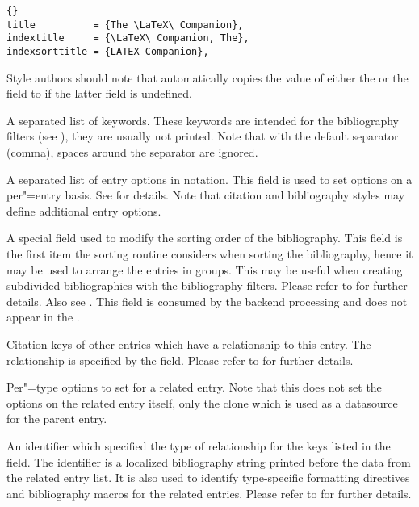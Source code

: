 \documentclass{ltxdockit}[2011/03/25]
\begin{document}
\begin{fieldlist}
\begin{lstlisting}[style=bibtex]{}
title          = {The \LaTeX\ Companion},
indextitle     = {\LaTeX\ Companion, The},
indexsorttitle = {LATEX Companion},
\end{lstlisting}
%
Style authors should note that  automatically copies the value of either the  or the  field to  if the latter field is undefined.


A separated list of keywords. These keywords are intended for the bibliography filters (see ), they are usually not printed. Note that with the default separator (comma), spaces around the separator are ignored.


A separated list of entry options in \keyval notation. This field is used to set options on a per"=entry basis. See  for details. Note that citation and bibliography styles may define additional entry options.


A special field used to modify the sorting order of the bibliography. This field is the first item the sorting routine considers when sorting the bibliography, hence it may be used to arrange the entries in groups. This may be useful when creating subdivided bibliographies with the bibliography filters. Please refer to  for further details. Also see . This field is consumed by the backend processing and does not appear in the .


Citation keys of other entries which have a relationship to this entry. The relationship is specified by the  field. Please refer to  for further details.


Per"=type options to set for a related entry. Note that this does not set the options on the related entry itself, only the  clone which is used as a datasource for the parent entry.


An identifier which specified the type of relationship for the keys listed in the  field. The identifier is a localized bibliography string printed
before the data from the related entry list. It is also used to identify type-specific
formatting directives and bibliography macros for the related entries. Please refer to  for further details.


\end{fieldlist}
\end{document}
